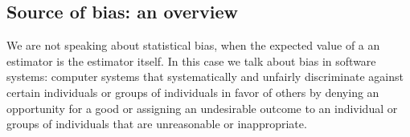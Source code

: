 \subsection{Source of bias: an overview}
We are not speaking about statistical bias, when the expected value of a an estimator is the estimator itself. In this case we talk about bias in software systems: computer systems that systematically and unfairly discriminate against certain individuals or groups of individuals in favor of others by denying an opportunity for a good or assigning an undesirable outcome to an individual or groups of individuals that are unreasonable or inappropriate.
